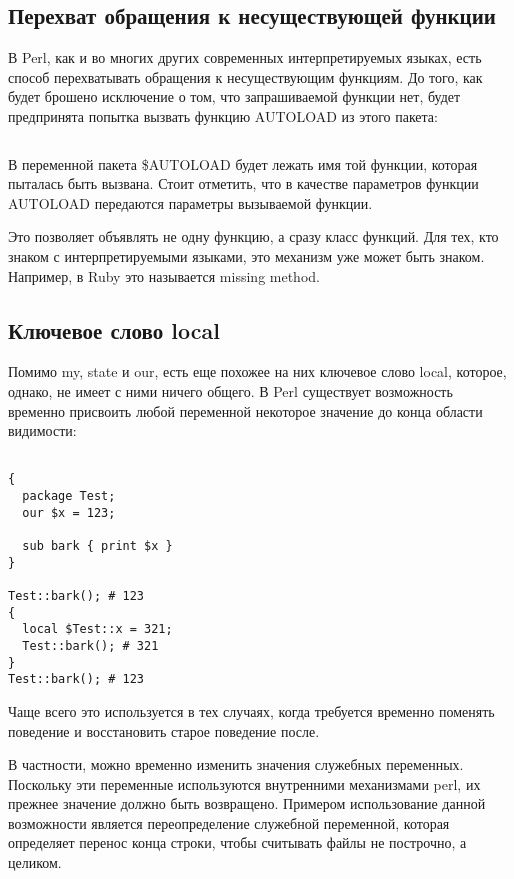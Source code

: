 \subsection{Перехват обращения к несуществующей функции} %
В Perl, как и во многих других современных интерпретируемых языках, есть способ перехватывать обращения к несуществующим функциям. До того, как будет брошено исключение о том, что запрашиваемой функции нет, будет предпринята попытка вызвать функцию AUTOLOAD из этого пакета:
\begin{verbatim}
\end{verbatim}
В переменной пакета \$AUTOLOAD будет лежать имя той функции, которая пыталась быть вызвана. Стоит отметить, что в качестве параметров функции AUTOLOAD передаются параметры вызываемой функции.

Это позволяет объявлять не одну функцию, а сразу класс функций. Для тех, кто знаком с интерпретируемыми языками, это механизм уже может быть знаком. Например, в Ruby это называется missing method.

\subsection{Ключевое слово local} %
Помимо my, state и our, есть еще похожее на них ключевое слово local, которое, однако, не имеет с ними ничего общего. В Perl существует возможность временно присвоить любой переменной некоторое значение до конца области видимости:
\begin{verbatim}

{
  package Test;
  our $x = 123;

  sub bark { print $x }
}

Test::bark(); # 123
{
  local $Test::x = 321;
  Test::bark(); # 321
}
Test::bark(); # 123
\end{verbatim}
Чаще всего это используется в тех случаях, когда требуется временно поменять поведение и восстановить старое поведение после.

В частности, можно временно изменить значения служебных переменных. Поскольку эти переменные используются внутренними механизмами perl, их прежнее значение должно быть возвращено. Примером использование данной возможности является переопределение служебной переменной, которая определяет перенос конца строки, чтобы считывать файлы не построчно, а целиком.

